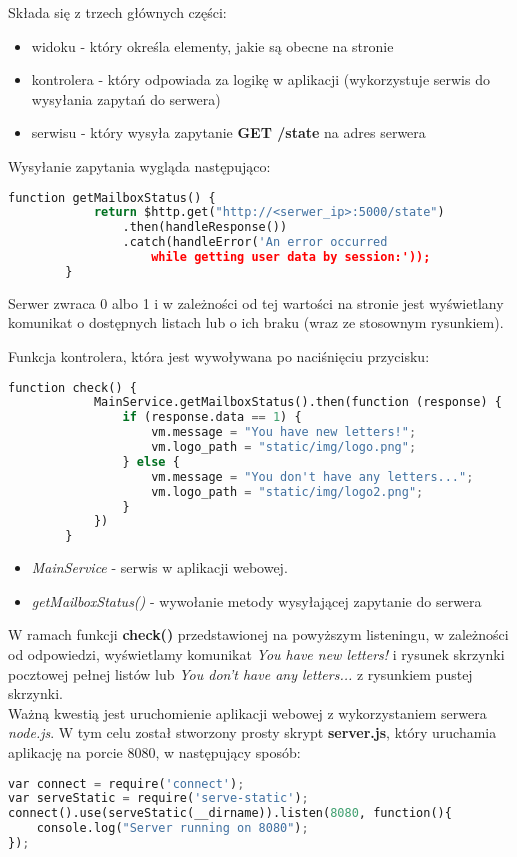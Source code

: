 Składa się z trzech głównych części:
\begin{itemize}
\item widoku - który określa elementy, jakie są obecne na stronie
\item kontrolera - który odpowiada za logikę w aplikacji (wykorzystuje serwis do wysyłania zapytań do serwera)
\item serwisu - który wysyła zapytanie \textbf{GET /state} na adres serwera
\end{itemize}

Wysyłanie zapytania wygląda następująco:
\begin{lstlisting}[language=Python]
function getMailboxStatus() {
            return $http.get("http://<serwer_ip>:5000/state")
                .then(handleResponse())
                .catch(handleError('An error occurred 
                	while getting user data by session:'));
        }
\end{lstlisting}

Serwer zwraca 0 albo 1 i w zależności od tej wartości na stronie jest wyświetlany komunikat o dostępnych listach lub o ich braku (wraz ze stosownym rysunkiem).

Funkcja kontrolera, która jest wywoływana po naciśnięciu przycisku:

\begin{lstlisting}[language=Python]
function check() {
            MainService.getMailboxStatus().then(function (response) {
                if (response.data == 1) {
                    vm.message = "You have new letters!";
                    vm.logo_path = "static/img/logo.png";
                } else {
                    vm.message = "You don't have any letters...";
                    vm.logo_path = "static/img/logo2.png";
                }
            })
        }
\end{lstlisting}

\begin{itemize}
\item \textit{MainService} -  serwis w aplikacji webowej.
\item \textit{getMailboxStatus()} - wywołanie metody wysyłającej zapytanie do serwera
\end{itemize}

W ramach funkcji \textbf{check()} przedstawionej na powyższym listeningu, w zależności od odpowiedzi, wyświetlamy komunikat \textit{You have new letters!} i rysunek skrzynki pocztowej pełnej listów lub \textit{You don't have any letters...} z rysunkiem pustej skrzynki.\\

Ważną kwestią jest uruchomienie aplikacji webowej z wykorzystaniem serwera \textit{node.js}.
W tym celu został stworzony prosty skrypt \textbf{server.js}, który uruchamia aplikację na porcie 8080, w następujący sposób:
\begin{lstlisting}[language=Python]
var connect = require('connect');
var serveStatic = require('serve-static');
connect().use(serveStatic(__dirname)).listen(8080, function(){
	console.log("Server running on 8080");
});
\end{lstlisting}

